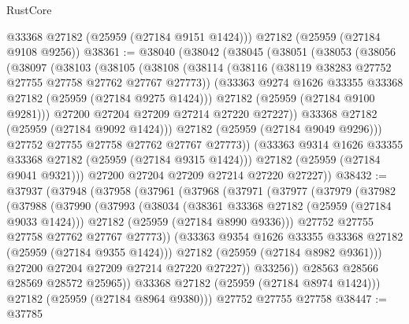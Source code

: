 \begin{lexlean}{RustCore}
\begin{coremodule}
      @33368
      @27182
      (@25959 (@27184 @9151 @1424)))
    @27182
    (@25959 (@27184 @9108 @9256))
@38361 := @38040
    (@38042
      (@38045
        (@38051
          (@38053
            (@38056
              (@38097
                (@38103
                  (@38105
                    (@38108
                      (@38114
                        (@38116 (@38119 @38283 @27752 @27755 @27758 @27762 @27767 @27773))
                        (@33363 @9274 @1626 @33355 @33368 @27182 (@25959 (@27184 @9275 @1424)))
                        @27182
                        (@25959 (@27184 @9100 @9281)))
                      @27200
                      @27204
                      @27209
                      @27214
                      @27220
                      @27227))
                  @33368
                  @27182
                  (@25959 (@27184 @9092 @1424)))
                @27182
                (@25959 (@27184 @9049 @9296)))
              @27752
              @27755
              @27758
              @27762
              @27767
              @27773))
          (@33363 @9314 @1626 @33355 @33368 @27182 (@25959 (@27184 @9315 @1424)))
          @27182
          (@25959 (@27184 @9041 @9321)))
        @27200
        @27204
        @27209
        @27214
        @27220
        @27227))
@38432 := @37937
    (@37948
      (@37958
        (@37961
          (@37968
            (@37971
              (@37977
                (@37979
                  (@37982
                    (@37988
                      (@37990
                        (@37993
                          (@38034
                            (@38361 @33368 @27182 (@25959 (@27184 @9033 @1424)))
                            @27182
                            (@25959 (@27184 @8990 @9336)))
                          @27752
                          @27755
                          @27758
                          @27762
                          @27767
                          @27773))
                      (@33363 @9354 @1626 @33355 @33368 @27182 (@25959 (@27184 @9355 @1424)))
                      @27182
                      (@25959 (@27184 @8982 @9361)))
                    @27200
                    @27204
                    @27209
                    @27214
                    @27220
                    @27227))
                @33256))
            @28563
            @28566
            @28569
            @28572
            @25965))
        @33368
        @27182
        (@25959 (@27184 @8974 @1424)))
      @27182
      (@25959 (@27184 @8964 @9380)))
    @27752
    @27755
    @27758
@38447 := @37785

\end{coremodule}
\end{lexlean}

